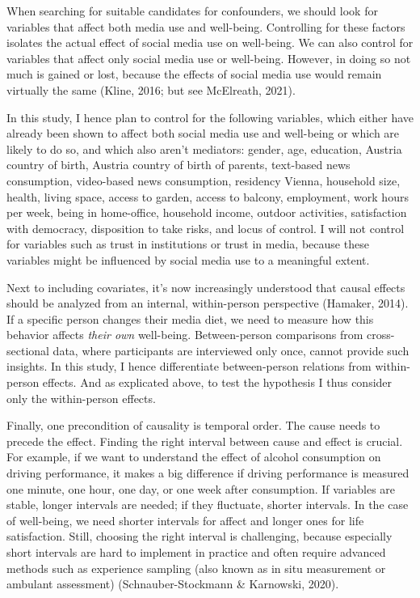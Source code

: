 \documentclass[
  english,
  man,mask,floatsintext]{apa6}
\begin{document}
When searching for suitable candidates for confounders, we should look for variables that affect both media use and well-being.
Controlling for these factors isolates the actual effect of social media use on well-being.
We can also control for variables that affect only social media use or well-being.
However, in doing so not much is gained or lost, because the effects of social media use would remain virtually the same (Kline, 2016; but see McElreath, 2021).

In this study, I hence plan to control for the following variables, which either have already been shown to affect both social media use and well-being or which are likely to do so, and which also aren't mediators:
gender, age, education, Austria country of birth, Austria country of birth of parents, text-based news consumption, video-based news consumption, residency Vienna, household size, health, living space, access to garden, access to balcony, employment, work hours per week, being in home-office, household income, outdoor activities, satisfaction with democracy, disposition to take risks, and locus of control.
I will not control for variables such as trust in institutions or trust in media, because these variables might be influenced by social media use to a meaningful extent.

Next to including covariates, it's now increasingly understood that causal effects should be analyzed from an internal, within-person perspective (Hamaker, 2014).
If a specific person changes their media diet, we need to measure how this behavior affects \emph{their own} well-being.
Between-person comparisons from cross-sectional data, where participants are interviewed only once, cannot provide such insights.
In this study, I hence differentiate between-person relations from within-person effects.
And as explicated above, to test the hypothesis I thus consider only the within-person effects.

Finally, one precondition of causality is temporal order.
The cause needs to precede the effect.
Finding the right interval between cause and effect is crucial.
For example, if we want to understand the effect of alcohol consumption on driving performance, it makes a big difference if driving performance is measured one minute, one hour, one day, or one week after consumption.
If variables are stable, longer intervals are needed; if they fluctuate, shorter intervals.
In the case of well-being, we need shorter intervals for affect and longer ones for life satisfaction.
Still, choosing the right interval is challenging, because especially short intervals are hard to implement in practice and often require advanced methods such as experience sampling (also known as in situ measurement or ambulant assessment) (Schnauber-Stockmann \& Karnowski, 2020).
\end{document}
